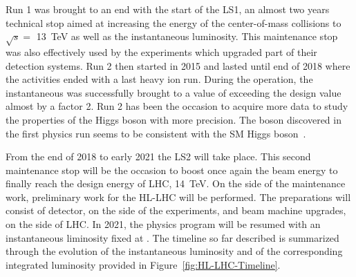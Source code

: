 	Run 1 was brought to an end with the start of the \acl{LS1}, an almost two years technical stop aimed at increasing the energy of the center-of-mass collisions to $\sqrt{s} =$ \SI{13}{TeV} as well as the instantaneous luminosity. This maintenance stop was also effectively used by the experiments which upgraded part of their detection systems. Run 2 then started in 2015 and lasted until end of 2018 where the activities ended with a last heavy ion run. During the operation, the instantaneous was successfully brought to a value of \siflux exceeding the design value almost by a factor 2. Run 2 has been the occasion to acquire more data to study the properties of the Higgs boson with more precision. The boson discovered in the first physics run seems to be consistent with the SM Higgs boson~\cite{HIGGS2015}.
	
	From the end of 2018 to early 2021 the \acl{LS2} will take place. This second maintenance stop will be the occasion to boost once again the beam energy to finally reach the design energy of LHC, \SI{14}{TeV}. On the side of the maintenance work, preliminary work for the \acl{HL-LHC} will be performed. The preparations will consist of detector, on the side of the experiments, and beam machine upgrades, on the side of LHC. In 2021, the physics program will be resumed with an instantaneous liminosity fixed at \siflux. The timeline so far described is summarized through the evolution of the instantaneous luminosity and of the corresponding integrated luminosity provided in Figure~\ref{fig:HL-LHC-Timeline}.
	
